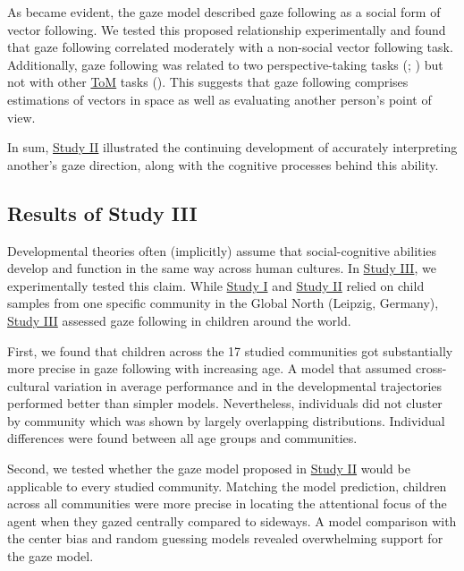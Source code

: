 \documentclass[
]{scrbook}
\begin{document}
As became evident, the gaze model described gaze following as a social form of vector following. We tested this proposed relationship experimentally and found that gaze following correlated moderately with a non-social vector following task. Additionally, gaze following was related to two perspective-taking tasks (; ) but not with other \hyperref[acronyms_ToM]{ToM} tasks (). This suggests that gaze following comprises estimations of vectors in space as well as evaluating another person's point of view.

In sum, \hyperref[studyII]{Study II} illustrated the continuing development of accurately interpreting another's gaze direction, along with the cognitive processes behind this ability.

\subsection{Results of Study III}\label{resultsIII}

Developmental theories often (implicitly) assume that social-cognitive abilities develop and function in the same way across human cultures. In \hyperref[studyIII]{Study III}, we experimentally tested this claim. While \hyperref[studyI]{Study I} and \hyperref[studyII]{Study II} relied on child samples from one specific community in the Global North (Leipzig, Germany), \hyperref[studyIII]{Study III} assessed gaze following in children around the world.

First, we found that children across the 17 studied communities got substantially more precise in gaze following with increasing age. A model that assumed cross-cultural variation in average performance and in the developmental trajectories performed better than simpler models. Nevertheless, individuals did not cluster by community which was shown by largely overlapping distributions. Individual differences were found between all age groups and communities.

Second, we tested whether the gaze model proposed in \hyperref[studyII]{Study II} would be applicable to every studied community. Matching the model prediction, children across all communities were more precise in locating the attentional focus of the agent when they gazed centrally compared to sideways. A model comparison with the center bias and random guessing models revealed overwhelming support for the gaze model.
\end{document}
